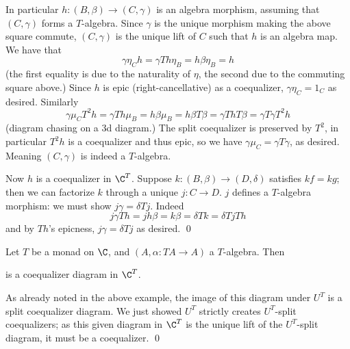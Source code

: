     In particular $h\colon(B,\beta)\to(C,\gamma)$ is an algebra morphism, assuming that $(C,\gamma)$ forms a $T$-algebra.
    Since $\gamma$ is the unique morphism making the above square commute, $(C,\gamma)$ is the unique lift of $C$ such that $h$ is an algebra map.
    We have that
    $$ \gamma\eta_Ch = \gamma Th\eta_B = h\beta\eta_B = h $$
    (the first equality is due to the naturality of $\eta$, the second due to the commuting square above.)
    Since $h$ is epic (right-cancellative) as a coequalizer, $\gamma\eta_C=1_C$ as desired.
    Similarly
    $$ \gamma\mu_CT^2h = \gamma Th\mu_B = h\beta\mu_B = h\beta T\beta = \gamma ThT\beta = \gamma T\gamma T^2h $$
    (diagram chasing on a 3d diagram.)
    The split coequalizer is preserved by $T^2$, in particular $T^2h$ is a coequalizer and thus epic, so we have $\gamma\mu_C=\gamma T\gamma$, as desired.
    Meaning $(C,\gamma)$ is indeed a $T$-algebra.

    Now $h$ is a coequalizer in $\C^T$.
    Suppose $k\colon(B,\beta)\to(D,\delta)$ satisfies $kf=kg$; then we can factorize $k$ through a unique $j\colon C\to D$.
    $j$ defines a $T$-algebra morphism: we must show $j\gamma=\delta Tj$.
    Indeed
    $$ j\gamma Th = jh\beta = k\beta = \delta Tk = \delta Tj Th $$
    and by $Th$'s epicness, $j\gamma=\delta Tj$ as desired.
    \qed

\eproof

\bcoro

    Let $T$ be a monad on $\C$, and $(A,\alpha\colon TA\to A)$ a $T$-algebra.
    Then

    \medskip
    \centerline{}
    \bigskip

    is a coequalizer diagram in $\C^T$.

\ecoro

\bproof

    As already noted in the above example, the image of this diagram under $U^T$ is a split coequalizer diagram.
    We just showed $U^T$ strictly creates $U^T$-split coequalizers; as this given diagram in $\C^T$ is the unique lift of the $U^T$-split diagram,
    it must be a coequalizer.
    \qed

